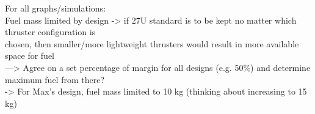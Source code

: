 For all graphs/simulations: \\
Fuel mass limited by design -> if 27U standard is to be kept no matter which thruster configuration is \\
chosen, then smaller/more lightweight thrusters would result in more available space for fuel \\
---> Agree on a set percentage of margin for all designs (e.g. 50\%) and determine maximum fuel from there? \\

-> For Max's design, fuel mass limited to 10 kg (thinking about increasing to 15 kg)\\
